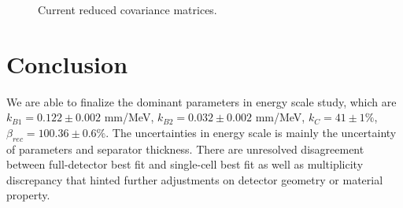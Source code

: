 \begin{figure}[h!]
\centering
{} \quad
{} \quad
\caption{Current reduced covariance matrices.}
\label{fig:cov}
\end{figure}

\section{Conclusion}

We are able to finalize the dominant parameters in energy scale study, which are $k_{B1} = 0.122 \pm 0.002$ mm/MeV, $k_{B2} = 0.032 \pm 0.002$ mm/MeV, $k_C = 41 \pm 1\%$, $\beta_{rec} = 100.36\pm0.6\%$.
The uncertainties in energy scale is mainly the uncertainty of parameters and separator thickness.
There are unresolved disagreement between full-detector best fit and single-cell best fit as well as multiplicity discrepancy that hinted further adjustments on detector geometry or material property.



\newpage
{}

